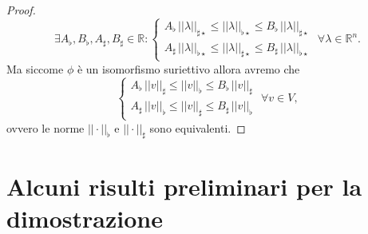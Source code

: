 \begin{proof}
    $$
    \exists A_\flat, B_\flat, A_\sharp, B_\sharp \in \mathbb{R} : \begin{cases}
        A_\flat \, ||\lambda||_{\sharp\star} \leq ||\lambda||_{\flat\star} \leq B_\flat \, ||\lambda||_{\sharp\star} \\
        A_\sharp \, ||\lambda||_{\flat\star} \leq ||\lambda||_{\sharp\star} \leq B_\sharp \, ||\lambda||_{\flat\star}
    \end{cases} \, \, \forall \lambda \in \mathbb{R}^n.
    $$
    Ma siccome $\phi$ è un isomorfismo suriettivo allora avremo che
    $$
    \begin{cases}
        A_\flat \, ||v||_{\sharp} \leq ||v||_{\flat} \leq B_\flat \, ||v||_{\sharp} \\
        A_\sharp \, ||v||_{\flat} \leq ||v||_{\sharp} \leq B_\sharp \, ||v||_{\flat}
    \end{cases} \, \, \forall v \in V,
    $$
    ovvero le norme $||\cdot||_{\flat}$ e $||\cdot||_{\sharp}$ sono equivalenti.
\end{proof}
\section{Alcuni risulti preliminari per la dimostrazione}

